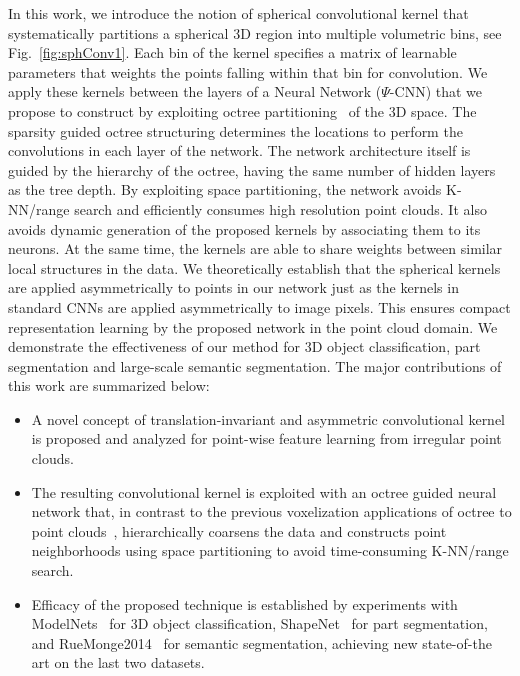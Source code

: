 \documentclass[10pt,twocolumn,letterpaper]{article}
\begin{document}
In this work, we introduce the notion of spherical convolutional kernel that systematically partitions a spherical 3D region into multiple volumetric bins, see Fig.~\ref{fig:sphConv1}. Each bin of the kernel specifies a matrix of learnable parameters that weights the points falling within that bin for convolution.
We apply these kernels between the layers of a Neural Network ($\Psi$-CNN) that we propose to construct by exploiting octree partitioning~\cite{meagher1982geometric} of the 3D space. The sparsity guided octree structuring determines the locations to perform the convolutions in each layer of the network. The network architecture itself is guided by the hierarchy of the octree, having the same number of hidden layers as the tree depth. By exploiting space partitioning, the network avoids K-NN/range search and efficiently consumes high resolution point clouds. 
It also avoids dynamic generation of the proposed kernels by associating them to its neurons. At the same time, 
the kernels are able to share weights between similar local structures in the data. We theoretically establish that the spherical kernels are applied asymmetrically to points in our network just as the kernels in standard CNNs are applied asymmetrically to image pixels. This ensures compact representation learning by the proposed network in the point cloud domain.  
We demonstrate the effectiveness of our method for 
3D object classification, part segmentation and large-scale semantic segmentation. 
The major contributions of this work are summarized  below:
\begin{itemize}
\item A novel concept of translation-invariant and asymmetric convolutional kernel is proposed and analyzed for point-wise feature learning from irregular point clouds. 
\item The resulting convolutional kernel is exploited with an octree guided neural network that, in contrast to the previous voxelization applications of octree to point clouds~\cite{riegler2016octnet}, hierarchically coarsens the data and constructs point neighborhoods using space partitioning to avoid time-consuming K-NN/range search.
\item Efficacy of the proposed technique is established by experiments with ModelNets~\cite{wu20153d} for 3D object classification, ShapeNet~\cite{yi2016scalable} for part segmentation, and  RueMonge2014~\cite{riemenschneider2014learning} for semantic segmentation, achieving new state-of-the art on the last two datasets.   
\end{itemize}
\end{document}
